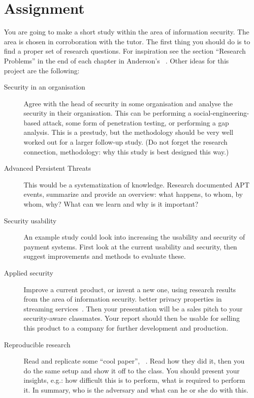 \documentclass[a4paper]{llncs}
\begin{document}
\section{Assignment}%
\label{sec:work}

You are going to make a short study within the area of information security.
The area is chosen in corroboration with the tutor.
The first thing you should do is to find a proper set of research questions.
For inspiration see the section \enquote{Research Problems} in the end of each 
chapter in Anderson's ~\cite{Anderson2008sea}.
Other ideas for this project are the following:
\begin{description}
  \item[Security in an organisation]
    Agree with the head of security in some organisation and analyse the 
    security in their organisation.
    This can be \eg performing a social-engineering-based attack, some form of 
    penetration testing, or performing a gap analysis.
    This is a prestudy, but the methodology should be very well worked out for 
    a larger follow-up study.
    (Do not forget the research connection, \eg methodology: why this study is 
    best designed this way.)

  \item[Advanced Persistent Threats]
    This would be a systematization of knowledge.
    Research documented APT events, summarize and provide an overview:
    what happens, to whom, by whom, why?
    What can we learn and why is it important?

  \item[Security usability]
    An example study could look into increasing the usability and security of 
    \eg payment systems.
    First look at the current usability and security, then suggest improvements 
    and methods to evaluate these.

  \item[Applied security]
    Improve a current product, or invent a new one, using research results from 
    the area of information security.
    \Eg better privacy properties in streaming services~\cite{anonpass}.
    Then your presentation will be a sales pitch to your security-aware 
    classmates.
    Your report should then be usable for selling this product to a company for 
    further development and production.

  \item[Reproducible research]
    Read and replicate some \enquote{cool paper}, \eg~\cite{acoustic}.
    Read how they did it, then you do the same setup and show it off to the 
    class.
    You should present your insights, e.g.:
    how difficult this is to perform,
    what is required to perform it.
    In summary, who is the adversary and what can he or she do with this.
\end{description}
\end{document}
